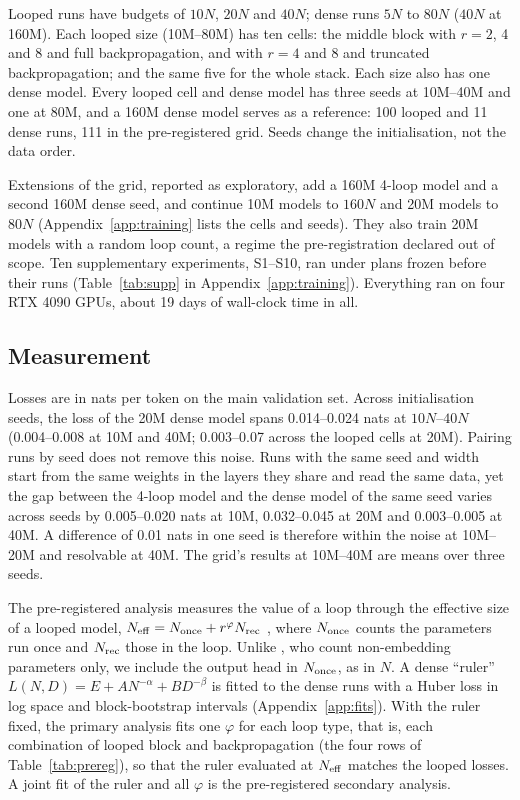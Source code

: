Looped runs have budgets of $10N$, $20N$ and $40N$; dense runs $5N$ to $80N$ ($40N$ at 160M). Each looped size
(10M--80M) has ten cells: the middle block with $r = 2$, 4 and 8 and full backpropagation, and with $r = 4$ and 8 and
truncated backpropagation; and the same five for the whole stack. Each size also has one dense model. Every looped cell and dense model has three seeds at
10M--40M and one at 80M, and a 160M dense model serves as a reference: 100 looped and 11 dense runs, 111 in the
pre-registered grid. Seeds change the initialisation,
not the data order.

Extensions of the grid, reported as exploratory, add a 160M 4-loop model and a second 160M dense seed, and continue
10M models to $160N$ and 20M models to $80N$
(Appendix~\ref{app:training} lists the cells and seeds). They also train 20M models with a random loop count, a
regime the pre-registration declared out of scope. Ten supplementary experiments, S1--S10, ran under plans frozen before their runs
(Table~\ref{tab:supp} in Appendix~\ref{app:training}). Everything ran on four RTX 4090 GPUs, about 19 days of wall-clock
time in all.

\subsection{Measurement}
\label{sec:measurement}

Losses are in nats per token on the main validation set. Across initialisation seeds, the loss of the 20M dense model
spans 0.014--0.024 nats at $10N$--$40N$ (0.004--0.008 at 10M and 40M; 0.003--0.07 across the looped cells at 20M).
Pairing runs by seed does not remove this noise. Runs with the same seed and width start from the same weights in the
layers they share and read the same data, yet the gap between the 4-loop model and the dense model of the same seed
varies across seeds by 0.005--0.020 nats at 10M, 0.032--0.045 at 20M and 0.003--0.005 at 40M. A difference of 0.01
nats in one seed is therefore within the noise at 10M--20M and resolvable at 40M. The grid's results at 10M--40M are
means over three seeds.

The pre-registered analysis measures the value of a loop through the effective size of a looped model, $N_{\mathrm{eff}} = N_{\mathrm{once}} + r^{\varphi}N_{\mathrm{rec}}$
\citep{schwethelm2026how}, where $N_{\mathrm{once}}$ counts the parameters run once and $N_{\mathrm{rec}}$ those in the loop. Unlike
\citet{schwethelm2026how}, who count non-embedding parameters only, we include the output head in $N_{\mathrm{once}}$, as in $N$.
A dense ``ruler'' $L(N, D) = E + A N^{-\alpha} + B D^{-\beta}$ is fitted to the dense runs
\citep{hoffmann2022training,besiroglu2024chinchilla} with a Huber loss in log space and block-bootstrap intervals
(Appendix~\ref{app:fits}). With the ruler fixed, the primary analysis fits one $\varphi$ for each loop type, that
is, each combination of looped block and backpropagation (the four rows of Table~\ref{tab:prereg}), so that the ruler
evaluated at $N_{\mathrm{eff}}$ matches the looped losses. A joint fit of the ruler and all $\varphi$ is the pre-registered
secondary analysis.

